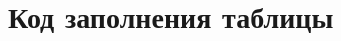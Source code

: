 \documentclass[bachelor, och, referat, times]{SCWorks}
\begin{document}
    
   
    
    \maketitle

    
    

    
    
   
    
    
    
    
    \section{Код заполнения таблицы}
\end{document}

